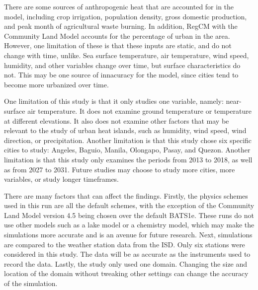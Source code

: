 	There are some sources of anthropogenic heat that are accounted for in the model, including crop irrigation, population density, gross domestic production, and peak month of agricultural waste burning.
	In addition, RegCM with the Community Land Model accounts for the percentage of urban in the area.
	However, one limitation of these is that these inputs are static, and do not change with time, unlike.
	Sea surface temperature, air temperature, wind speed, humidity, and other variables change over time, but surface characteristics do not.
	This may be one source of innacuracy for the model, since cities tend to become more urbanized over time.
	
	One limitation of this study is that it only studies one variable, namely: near-surface air temperature.
	It does not examine ground temperature or temperature at different elevations.
	It also does not examine other factors that may be relevant to the study of urban heat islands, such as humidity, wind speed, wind direction, or precipitation. 
	Another limitation is that this study chose six specific cities to study: Angeles, Baguio, Manila, Olongapo, Pasay, and Quezon.
	Another limitation is that this study only examines the periods from 2013 to 2018, as well as from 2027 to 2031.
	Future studies may choose to study more cities, more variables, or study longer timeframes.
	
	There are many factors that can affect the findings. 
	Firstly, the physics schemes used in this run are all the default schemes, with the exception of the Community Land Model version 4.5 being chosen over the default BATS1e. 
	These runs do not use other models such as a lake model or a chemistry model, which may make the simulations more accurate and is an avenue for future research.
	Next, simulations are compared to the weather station data from the ISD.
	Only six stations were considered in this study.
	The data will be as accurate as the instruments used to record the data.
	Lastly, the study only used one domain.
	Changing the size and location of the domain without tweaking other settings can change the accuracy of the simulation.